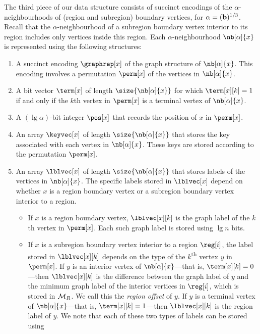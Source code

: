 {The third piece of our data structure consists of succinct encodings
of the $\alpha$-neighbourhoods of (region and subregion) boundary
vertices, for $\alpha = (\textbf{b})^{1/3}$.
Recall that the $\alpha$-neighbourhood of a subregion boundary vertex interior
to its region includes only vertices inside this region.
Each $\alpha$-neighbourhood $\nb[\alpha]{x}$ is represented using the
following structures:
\begin{enumerate}
\item A succinct encoding $\graphrep[x]$ of the graph structure of
  $\nb[\alpha]{x}$.
  This encoding involves a permutation $\perm[x]$ of the vertices in
  $\nb[\alpha]{x}$.
\item A bit vector $\term[x]$ of length $\size{\nb[\alpha]{x}}$ for which
  $\term[x][k] = 1$ if and only if the $k$th vertex in $\perm[x]$ is a terminal
  vertex of $\nb[\alpha]{x}$.
\item A $(\lg \alpha)$-bit integer $\pos[x]$ that records the position of
  $x$ in $\perm[x]$.
\item An array $\keyvec[x]$ of length $\size{\nb[\alpha]{x}}$ that stores the
  key associated with each vertex in $\nb[\alpha]{x}$.
  These keys are stored according to the permutation $\perm[x]$.
\item An array $\lblvec[x]$ of length $\size{\nb[\alpha]{x}}$ that stores
  labels of the vertices in $\nb[\alpha]{x}$.
  The specific labels stored in $\lblvec[x]$ depend on whether $x$ is a region
  boundary vertex or a subregion boundary vertex interior to a region.
  \begin{itemize}
  \item If $x$ is a region boundary vertex, $\lblvec[x][k]$ is the graph
    label of the $k$th vertex in $\perm[x]$.
    Each such graph label is stored using $\lg n$ bits.
  \item If $x$ is a subregion boundary vertex interior to a region
    $\reg[i]$, the label stored in $\lblvec[x][k]$ depends on the type of the
    $k$\textsuperscript{th} vertex $y$ in $\perm[x]$.
    If $y$ is an interior vertex of $\nb[\alpha]{x}$---that is,
    $\term[x][k] = 0$---then $\lblvec[x][k]$ is the difference between the graph
    label of $y$ and the minimum graph label of the interior vertices in
    $\reg[i]$,  which is stored in $\mathcal{M}_R$.
    We call this the \emph{region offset} of $y$.
    If $y$ is a terminal vertex of $\nb[\alpha]{x}$---that is,
    $\term[x][k] = 1$---then $\lblvec[x][k]$ is the region label of $y$.
    We note that each of these two types of labels can be stored using

\end{itemize}
\end{enumerate}}

